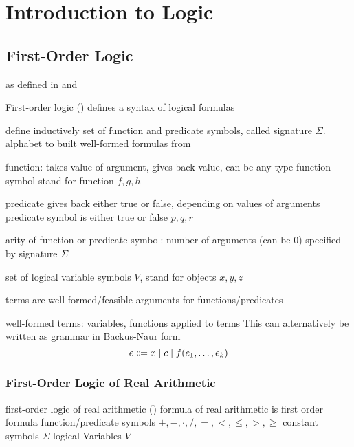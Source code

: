 \chapter{Introduction to Logic}
\label{sec:introduction-logic}

    \section{First-Order Logic}
    \label{sec:first-order-logic}

        as defined in \cite{Platzer10HybridSystems} and \cite{Huth04LogicInCS}

        First-order logic (\FOL) defines  a syntax of logical formulas


        define inductively
        set of function and predicate symbols, called signature $\Sigma$. alphabet to built well-formed formulas from

        function: takes value of argument, gives back value, can be any type
        function symbol stand for function
        $f,g,h$

        predicate gives back either true or false, depending on values of arguments
        predicate symbol is either true or false
        $p,q,r$

        arity of function or predicate symbol: number of arguments (can be 0)
        specified by signature $\Sigma$

        set of logical variable symbols $V$, stand for objects
        $x,y,z$

        terms are well-formed/feasible arguments for functions/predicates

        \begin{definition}[Terms]
            well-formed terms: variables, functions applied to terms
            This can alternatively be written as grammar in Backus-Naur form
            \begin{equation}
                e \Coloneqq x \mid c \mid f(e_{1},\ldots,e_{k})
            \end{equation}

        \end{definition}

        \begin{definition}


        \end{definition}

        \subsection{First-Order Logic of Real Arithmetic}
        \label{sec:first-order-logic-of-real-arithmetic}

            first-order logic of real arithmetic (\FOLR)
            formula of real arithmetic
            is first order formula
            function/predicate symbols $+,-,\cdot,/,=,<,\leq,>,\geq$
            constant symbols $\Sigma$
            logical Variables $V$
